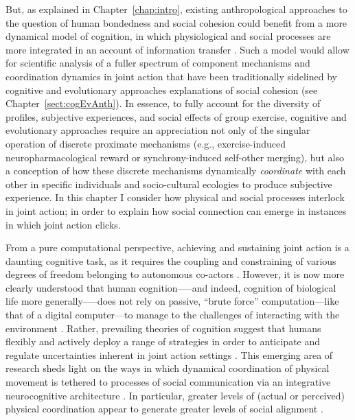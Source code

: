 \begin{CJK}{UTF8}{gbsn}
But, as explained in Chapter~\ref{chap:intro}, existing anthropological approaches to the question of human bondedness and social cohesion could benefit from a more dynamical model of cognition, in which physiological and social processes are more integrated in an account of information transfer  \citep{Roepstorff2010,Badcock2012,Ramstead2017}.  Such a model would allow for scientific analysis of a fuller spectrum of component mechanisms and coordination dynamics in joint action that have been traditionally sidelined by cognitive and evolutionary approaches explanations of social cohesion (see Chapter~\ref{sect:cogEvAnth}).  In essence, to fully account for the diversity of profiles, subjective experiences, and social effects of group exercise, cognitive and evolutionary approaches require an appreciation not only of the singular operation of discrete proximate mechanisms (e.g., exercise-induced neuropharmacological reward or synchrony-induced self-other merging), but also a conception of how these discrete mechanisms dynamically \textit{coordinate} with each other in specific individuals and socio-cultural ecologies to produce subjective experience.  In this chapter I consider how physical and social processes interlock in joint action; in order to explain how social connection can emerge in instances in which joint action clicks.

From a pure computational perspective, achieving and sustaining joint action is a daunting cognitive task, as it requires the coupling and constraining of various degrees of freedom belonging to autonomous co-actors \citep{Bernstein1967,Turvey1978}.  However, it is now more clearly understood that human cognition—--and indeed, cognition of biological life more generally—--does not rely on passive, ``brute force'' computation---like that of a digital computer---to manage to the challenges of interacting with the environment \citep{Yufik2013}.  Rather, prevailing theories of cognition suggest that humans flexibly and actively deploy a range of strategies in order to anticipate and regulate uncertainties inherent in joint action settings \citep{Friston2010,Clark2015}.
This emerging area of research sheds light on the ways in which dynamical coordination of physical movement is tethered to processes of social communication via an integrative neurocognitive architecture \citep{Semin2008,Wheatley2016,Ramstead2016}.
In particular, greater levels of (actual or perceived) physical coordination appear to generate greater levels of social alignment \citep[e.g., emotional support, perceptions of common goal, and shared social identity][]{Semin2008,Wheatley2012,Launay2016,Mogan2017}.


\end{CJK}
